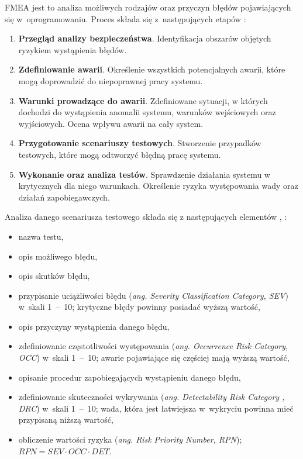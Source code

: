 \documentclass[a4paper, 12pt, twoside]{article}
\begin{document}
FMEA jest to analiza możliwych rodzajów oraz przyczyn błędów pojawiających się w~oprogramowaniu. Proces składa się z~następujących etapów \cite{honeywellFMEA}:
\begin{enumerate}[1.]
   \item  \textbf{Przegląd analizy bezpieczeństwa}. Identyfikacja obszarów objętych ryzykiem wystąpienia błędów. 
   \item  \textbf{Zdefiniowanie awarii}. Określenie wszystkich potencjalnych awarii, które mogą doprowadzić do niepoprawnej pracy systemu.
   \item  \textbf{Warunki prowadzące do awarii}. Zdefiniowane sytuacji, w których dochodzi do wystąpienia anomalii systemu, warunków wejściowych oraz wyjściowych. Ocena wpływu awarii na cały system.
   \item  \textbf{Przygotowanie scenariuszy testowych}. Stworzenie przypadków testowych, które mogą odtworzyć błędną pracę systemu.
   \item  \textbf{Wykonanie oraz analiza testów}. Sprawdzenie działania systemu w krytycznych dla niego warunkach. Określenie ryzyka występowania wady oraz działań zapobiegawczych. 
\end{enumerate}
Analiza danego scenariusza testowego składa się z następujących elementów \cite{honeywellFMEA}, \cite{fmeaWiki}:
\begin{itemize}
   \item nazwa testu,
   \item opis możliwego błędu, 
   \item opis skutków błędu, 
   \item przypisanie uciążliwości błędu (\textit{ang. Severity Classification Category, SEV}) w~skali 1~--~10; krytyczne błędy powinny posiadać wyższą wartość,
   \item opis przyczyny wystąpienia danego błędu,
   \item zdefiniowanie częstotliwości występowania (\textit{ang. Occurrence Risk Category, OCC}) w~skali 1~--~10; awarie pojawiające się częściej mają wyższą wartość,
   \item opisanie procedur zapobiegających wystąpieniu danego błędu,
   \item zdefiniowanie skuteczności wykrywania  (\textit{ang. Detectability Risk Category , DRC}) w~skali 1~--~10; wada, która jest łatwiejsza w~wykryciu powinna mieć przypisaną niższą wartość,
   \item obliczenie wartości ryzyka  (\textit{ang. Risk Priority Number, RPN}); \( RPN = SEV \cdot OCC \cdot DET\).
\end{itemize}
\end{document}
